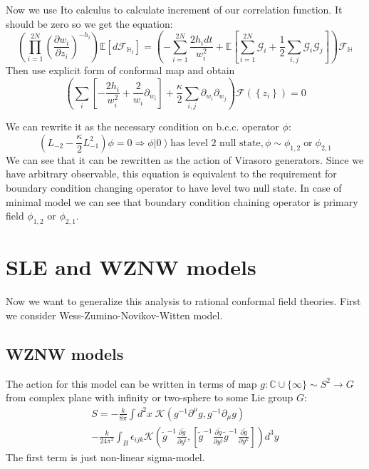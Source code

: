 \documentclass[12pt]{article}
\theoremstyle{definition}
\theoremstyle{definition} \newtheorem{Def}{Definition}
\begin{document}
Now we use Ito calculus to calculate increment of our correlation function. It should be zero so we get the equation:
\begin{equation*}
  \left(\prod_{i=1}^{2N}\left(\frac{\partial w_{i}}{\partial z_{i}}\right)^{-h_{i}}\right)\mathbb{E}\left[d 
    \mathcal{F}_{\mathbb{H}_{t}}\right]=\left(-\sum_{i=1}^{2N}\frac{2h_{i}dt}{w_{i}^{2}}+\mathbb{E}\left[\sum_{i=1}^{2N}\mathcal{G}_{i}+\frac{1}{2}
      \sum_{i,j}\mathcal{G}_{i}\mathcal{G}_{j}\right]\right)\mathcal{F}_{\mathbb{H}}
\end{equation*}
Then use explicit form of conformal map and obtain
\begin{equation*}
  \left( \sum_{i}\left[-\frac{2h_{i}}{w_{i}^{2}} +\frac{2}{w_{i}}\partial_{w_{i}}\right]+\frac{\kappa}{2}\sum_{i,j}\partial_{w_{i}} \partial_{w_{j}}\right)\mathcal{F}(\left\{z_{i}\right\})=0
\end{equation*}

We can rewrite it as the necessary condition on b.c.c. operator $\phi$:
\begin{equation*}
  (L_{-2}-\frac{\kappa}{2}L_{-1}^{2})\phi=0 \Longrightarrow \phi \left|0\right>  \text{has level 2 null state}, \phi\sim \phi_{1,2} \;\text{or}\; \phi_{2,1}
\end{equation*}
We can see that it can be rewritten as the action of Virasoro generators. Since we have arbitrary observable, this equation is equivalent to the requirement for boundary condition changing operator to have level two null state. 
In case of minimal model we can see that boundary condition chaining operator is primary field $\phi_{1,2}$ or $\phi_{2,1}$.

\section{SLE and WZNW models}
\label{sec:sle-wzw-models}
Now we want to generalize this analysis to rational conformal field theories. First we consider Wess-Zumino-Novikov-Witten model.
\subsection{WZNW models}

 The action for this model can be written in terms of map $g:\mathbb{C}\cup \{\infty\}\sim S^{2}\to G$ from complex plane with infinity or two-sphere to some Lie group $G$:
\begin{multline}
  S=-\frac{k}{8\pi}\int d^2x\; \mathcal{K} (g^{-1}\partial^{\mu}g, g^{-1} \partial_{\mu}g)  
  \\
  - \frac{k }{24\pi^{2}} \int_{B}\epsilon_{ijk} \mathcal{K}\left(
    \tilde g^{-1}\frac{\partial \tilde g}{\partial y^i},\left[
      \tilde g^{-1}\frac{\partial \tilde g}{\partial y^j}
      \tilde g^{-1}\frac{\partial \tilde g}{\partial y^k}\right]\right) d^3y
\end{multline}
The first term is just non-linear sigma-model.
\end{document}
